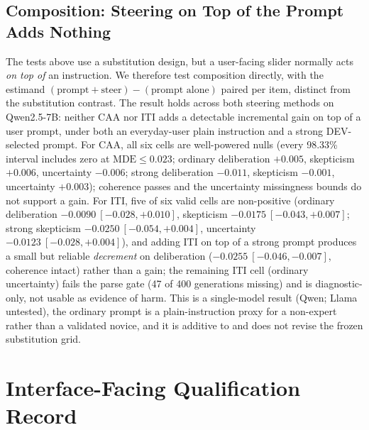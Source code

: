 \documentclass[manuscript,review,anonymous]{acmart}
\begin{document}

\subsection{Composition: Steering on Top of the Prompt Adds Nothing}\label{composition-on-top}

The tests above use a substitution design, but a user-facing slider normally acts \emph{on top of} an instruction. We therefore test composition directly, with the estimand \((\text{prompt}+\text{steer})-(\text{prompt alone})\) paired per item, distinct from the substitution contrast. The result holds across both steering methods on Qwen2.5-7B: neither CAA nor ITI adds a detectable incremental gain on top of a user prompt, under both an everyday-user plain instruction and a strong DEV-selected prompt. For CAA, all six cells are well-powered nulls (every 98.33\% interval includes zero at \(\text{MDE}\le0.023\); ordinary deliberation \(+0.005\), skepticism \(+0.006\), uncertainty \(-0.006\); strong deliberation \(-0.011\), skepticism \(-0.001\), uncertainty \(+0.003\)); coherence passes and the uncertainty missingness bounds do not support a gain. For ITI, five of six valid cells are non-positive (ordinary deliberation \(-0.0090\ [-0.028,+0.010]\), skepticism \(-0.0175\ [-0.043,+0.007]\); strong skepticism \(-0.0250\ [-0.054,+0.004]\), uncertainty \(-0.0123\ [-0.028,+0.004]\)), and adding ITI on top of a strong prompt produces a small but reliable \emph{decrement} on deliberation (\(-0.0255\ [-0.046,-0.007]\), coherence intact) rather than a gain; the remaining ITI cell (ordinary uncertainty) fails the parse gate (47 of 400 generations missing) and is diagnostic-only, not usable as evidence of harm. This is a single-model result (Qwen; Llama untested), the ordinary prompt is a plain-instruction proxy for a non-expert rather than a validated novice, and it is additive to and does not revise the frozen substitution grid. {}%

\section{Interface-Facing Qualification Record}\label{interface-facing-qualification-record}
\end{document}
